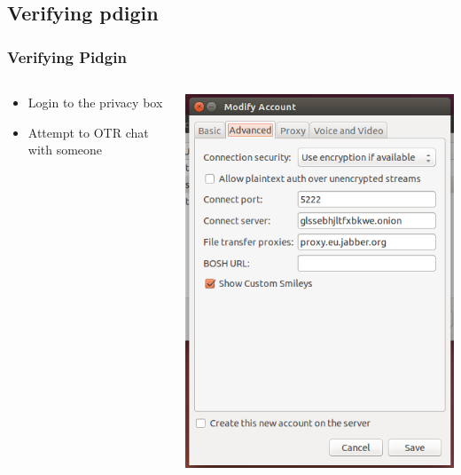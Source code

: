 \documentclass{beamer}
\begin{document}
\subsection{Verifying pdigin}
\begin{frame}
\frametitle{Verifying Pidgin}
\begin{columns}
    \begin{column}{0.48\textwidth}
        \begin{itemize}
          \item Login to the privacy box
          \item Attempt to OTR chat with someone
        \end{itemize}
    \end{column}
    \begin{column}{.5\textwidth}
        \includegraphics[width=.9\linewidth]{pidgin_advanced}
    \end{column}
\end{columns}
\end{frame}
\end{document}
